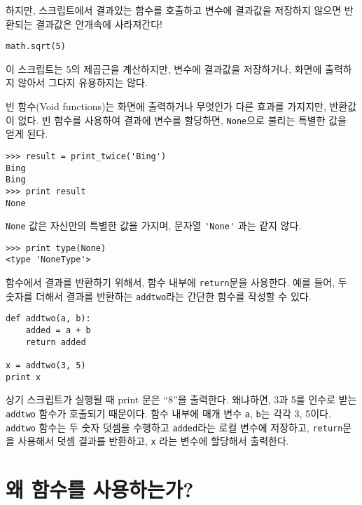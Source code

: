 하지만, 스크립트에서 결과있는 함수를 호출하고 변수에 결과값을 저장하지 않으면 반환되는 결과값은 안개속에 사라져간다!

\beforeverb
\begin{verbatim}
math.sqrt(5)
\end{verbatim}
\afterverb
%
이 스크립트는 5의 제곱근을 계산하지만, 변수에 결과값을 저장하거나, 화면에 출력하지 않아서 그다지 유용하지는 않다.


빈 함수(Void functions)는 화면에 출력하거나 무엇인가 다른 효과를 가지지만, 반환값이 없다.
빈 함수를 사용하여 결과에 변수를 할당하면, {\tt None}으로 불리는 특별한 값을 얻게 된다.


\beforeverb
\begin{verbatim}
>>> result = print_twice('Bing')
Bing
Bing
>>> print result
None
\end{verbatim}
\afterverb
%

{\tt None} 값은 자신만의 특별한 값을 가지며, 문자열 \verb"'None'" 과는 같지 않다. 

\beforeverb
\begin{verbatim}
>>> print type(None)
<type 'NoneType'>
\end{verbatim}
\afterverb
%

함수에서 결과를 반환하기 위해서, 함수 내부에 {\tt return}문을 사용한다.
예를 들어, 두 숫자를 더해서 결과를 반환하는 {\tt addtwo}라는 간단한 함수를 작성할 수 있다. 

\beforeverb
\begin{verbatim}
def addtwo(a, b):
    added = a + b
    return added

x = addtwo(3, 5)
print x
\end{verbatim}
\afterverb
%

상기 스크립트가 실행될 때 print 문은 ``8''을 출력한다. 
왜냐하면, 3과 5를 인수로 받는 {\tt addtwo} 함수가 호출되기 때문이다.
함수 내부에 매개 변수 {\tt a}, {\tt b}는 각각 3, 5이다.
{\tt addtwo} 함수는 두 숫자 덧셈을 수행하고 {\tt added}라는 로컬 변수에 저장하고, {\tt return}문을 사용해서 덧셈 결과를 반환하고,
{\tt x} 라는 변수에 할당해서 출력한다.

\section{왜 함수를 사용하는가?}

